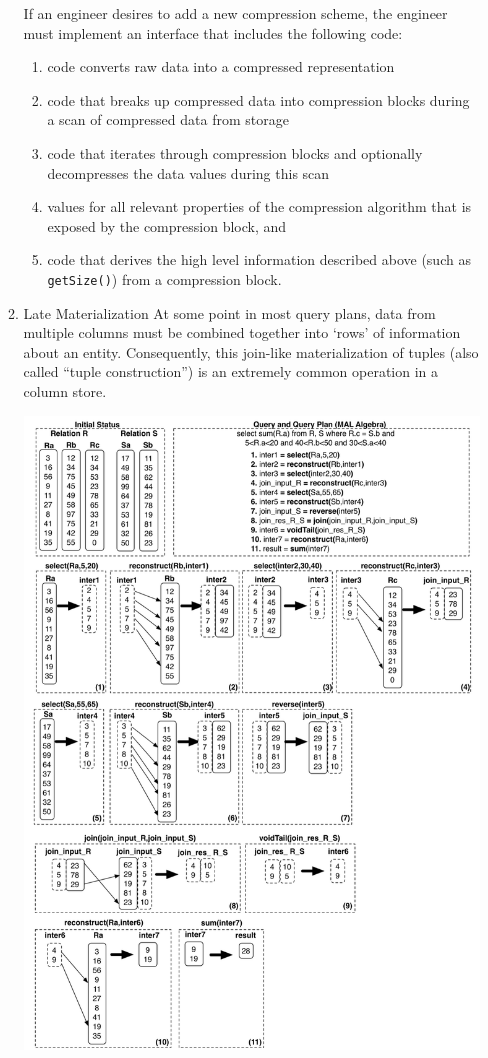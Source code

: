 \documentclass[11pt]{article}
\begin{document}
\begin{enumerate}
\begin{enumerate}
If an engineer desires to add a new compression scheme, the engineer must implement an interface that
includes the following code:
\begin{enumerate}
\item code converts raw data into a compressed representation
\item code that breaks up compressed data into compression blocks during a scan of compressed data from
storage
\item code that iterates through compression blocks and optionally decompresses the data values during
this scan
\item values for all relevant properties of the compression algorithm that is exposed by the compression
block, and
\item code that derives the high level information described above (such as \texttt{getSize()}) from a compression
block.
\end{enumerate}
\item Late Materialization
\label{sec:orgb0ac296}
At some point in most query plans, data from multiple columns must be combined together into ‘rows’ of
information about an entity. Consequently, this join-like materialization of tuples (also called
“tuple construction”) is an extremely common operation in a column store.

\begin{center}
\includegraphics[width=.8\textwidth]{../images/bigdatabase/14.png}
\end{center}


\end{enumerate}
\end{enumerate}
\end{document}
